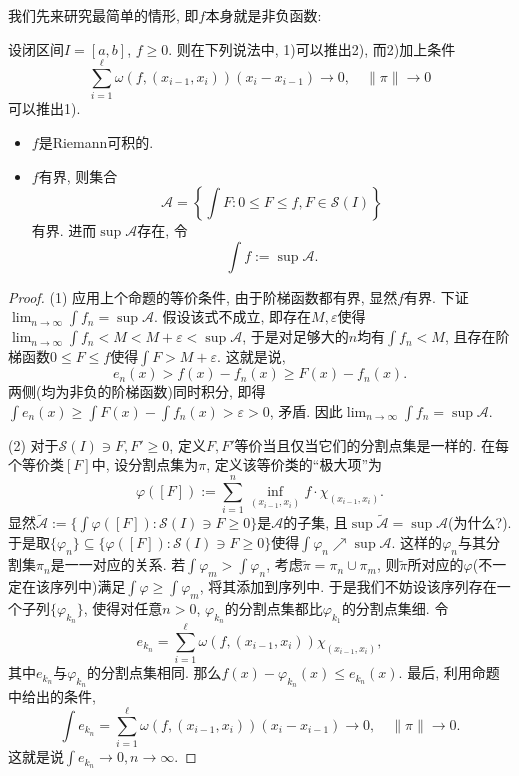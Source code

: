 我们先来研究最简单的情形, 即$f$本身就是非负函数: 

\begin{proposition}{} \label{pro:fwfuhjuubijb}
	设闭区间$I=[a,b]$, $f \geq 0$. 则在下列说法中, 1)可以推出2), 而2)加上条件$$\sum_{i=1}^{\ell} \omega (f,(x_{i-1},x_i)) (x_i-x_{i-1}) \to 0,\quad \| \pi \| \to 0$$可以推出1). 
	\begin{itemize}
		\item $f$是Riemann可积的. 
		\item $f$有界, 则集合$$\mathcal{A} = \left\{ \int F:0\leq F \leq f, F \in \mathcal{S}(I)  \right\}$$
		有界. 进而$\sup \mathcal{A}$存在, 令$$\int f := \sup \mathcal{A}.$$
	\end{itemize}
\end{proposition}
\begin{proof}
	(1) 应用上个命题的等价条件, 由于阶梯函数都有界, 显然$f$有界. 下证$\lim_{n\to \infty} \int f_n = \sup \mathcal{A}$. 假设该式不成立, 即存在$M,\varepsilon$使得$\lim_{n\to \infty} \int f_n < M < M+\varepsilon < \sup \mathcal{A}$, 于是对足够大的$n$均有$\int f_n < M$, 且存在阶梯函数$0\leq F \leq f$使得$\int F > M+\varepsilon$. 这就是说, $$e_n(x) > f(x)-f_n(x) \geq F(x)-f_n(x).$$
	两侧(均为非负的阶梯函数)同时积分, 即得$\int e_n(x) \geq \int F(x) - \int f_n(x) > \varepsilon >0$, 矛盾. 因此$\lim_{n\to \infty} \int f_n = \sup \mathcal{A}$. 
	
	(2) 对于$\mathcal{S}(I) \ni F,F' \geq 0$, 定义$F,F'$等价当且仅当它们的分割点集是一样的. 在每个等价类$[F]$中, 设分割点集为$\pi$, 定义该等价类的“极大项”为$$\varphi ([F]) := \sum_{i=1}^{n} \inf_{(x_{i-1},x_i)} f \cdot \chi _{(x_{i-1},x_i)}.$$
	显然$\tilde{\mathcal{A}}:=\{ \int \varphi ([F]):\mathcal{S}(I) \ni F \geq 0 \}$是$\mathcal{A}$的子集, 且$\sup \tilde{\mathcal{A}} = \sup \mathcal{A}$(为什么?). 于是取$\{ \varphi _n \} \subseteq \{ \varphi ([F]):\mathcal{S}(I) \ni F \geq 0 \}$使得$\int \varphi _n \nearrow \sup \mathcal{A}$. 这样的$\varphi _n$与其分割集$\pi _n$是一一对应的关系. 若$\int \varphi _m > \int \varphi _n$, 考虑$\tilde{\pi} = \pi _n \cup \pi _m$, 则$\tilde{\pi}$所对应的$\varphi$(不一定在该序列中)满足$\int \varphi \geq \int \varphi _m$, 将其添加到序列中. 于是我们不妨设该序列存在一个子列$\{ \varphi _{k_n} \}$, 使得对任意$n>0$, $\varphi _{k_n}$的分割点集都比$\varphi _{k_1}$的分割点集细. 令$$e_{k_n} = \sum_{i=1}^{\ell} \omega (f,(x_{i-1},x_i)) \chi _{(x_{i-1},x_i)}, $$
	其中$e_{k_n}$与$\varphi _{k_n}$的分割点集相同. 那么$f(x)-\varphi _{k_n}(x) \leq e_{k_n}(x)$. 最后, 利用命题中给出的条件, $$\int e_{k_n} = \sum_{i=1}^{\ell} \omega (f,(x_{i-1},x_i)) (x_i-x_{i-1}) \to 0, \quad \| \pi \| \to 0. $$
	这就是说$\int e_{k_n} \to 0,n \to \infty$. 
\end{proof}
